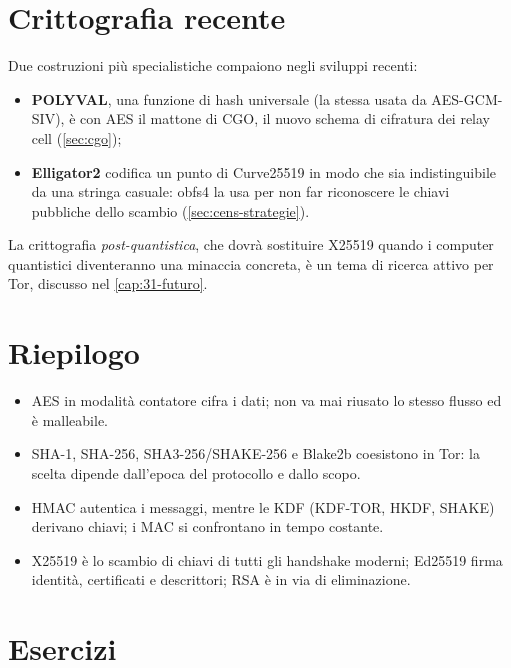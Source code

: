 \section{Crittografia recente}\label{sec:cripto-recente}

Due costruzioni più specialistiche compaiono negli sviluppi recenti:
\begin{itemize}
  \item \textbf{POLYVAL}, una funzione di hash universale (la stessa usata da AES-GCM-SIV), è con AES il mattone di CGO, il nuovo schema di cifratura dei relay cell (\cref{sec:cgo});
  \item \textbf{Elligator2} codifica un punto di Curve25519 in modo che sia indistinguibile da una stringa casuale: obfs4 la usa per non far riconoscere le chiavi pubbliche dello scambio (\cref{sec:cens-strategie}).
\end{itemize}
La crittografia \emph{post-quantistica}, che dovrà sostituire X25519 quando i computer quantistici diventeranno una minaccia concreta, è un tema di ricerca attivo per Tor, discusso nel \cref{cap:31-futuro}.

\section*{Riepilogo}
\begin{itemize}
  \item AES in modalità contatore cifra i dati; non va mai riusato lo stesso flusso ed è malleabile.
  \item SHA-1, SHA-256, SHA3-256/SHAKE-256 e Blake2b coesistono in Tor: la scelta dipende dall'epoca del protocollo e dallo scopo.
  \item HMAC autentica i messaggi, mentre le KDF (KDF-TOR, HKDF, SHAKE) derivano chiavi; i MAC si confrontano in tempo costante.
  \item X25519 è lo scambio di chiavi di tutti gli handshake moderni; Ed25519 firma identità, certificati e descrittori; RSA è in via di eliminazione.
\end{itemize}

\section*{Esercizi}

